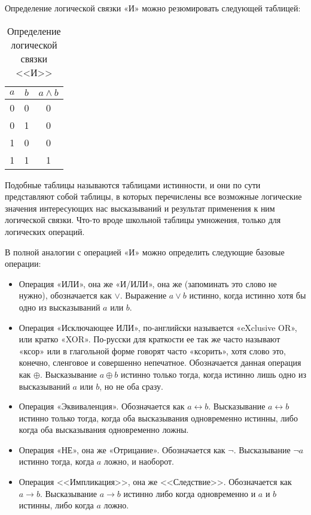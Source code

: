 Определение логической связки «И» можно резюмировать следующей таблицей:

\begin{table}[h]
\centering
\begin{tabular}{c c | c}
$a$ & $b$ & $a \land b$ \\
\hline
0 & 0 & 0 \\
0 & 1 & 0 \\
1 & 0 & 0 \\
1 & 1 & 1
\end{tabular}
\caption{Определение логической связки <<И>>}\label{table:logic-and}
\end{table}


Подобные таблицы называются таблицами истинности, и они по сути представляют собой таблицы, в которых перечислены все возможные логические значения интересующих нас высказываний и результат применения к ним логической связки. Что-то вроде школьной таблицы умножения, только для логических операций.

В полной аналогии с операцией «И» можно определить следующие базовые операции:

\begin{itemize}
\item Операция «ИЛИ», она же «И/ИЛИ», она же  (запоминать это слово не нужно), обозначается как $\lor$. Выражение $a\lor b$ истинно, когда истинно хотя бы одно из высказываний $a$ или $b$.
\item Операция «Исключающее ИЛИ», по-английски называется «eXclusive OR», или кратко «XOR». По-русски для краткости ее так же часто называют «ксор» или в глагольной форме говорят часто «ксорить», хотя слово это, конечно, сленговое и совершенно непечатное. Обозначается данная операция как $\oplus$. Высказывание $a \oplus b$ истинно только тогда, когда истинно лишь одно из высказываний $a$ или $b$, но не оба сразу.
\item Операция «Эквиваленция». Обозначается как $a \leftrightarrow b$. Высказывание $a \leftrightarrow b$ истинно только тогда, когда оба высказывания одновременно истинны, либо когда оба высказывания одновременно ложны.
\item Операция «НЕ», она же «Отрицание». Обозначается как $\neg$. Высказывание $\neg a$ истинно тогда, когда $a$ ложно, и наоборот.
\item Операция <<Импликация>>, она же <<Следствие>>. Обозначается как $a \to b$. Высказывание $a \to b$ истинно либо когда одновременно и $a$ и $b$ истинны, либо когда $a$ ложно.
\end{itemize}

